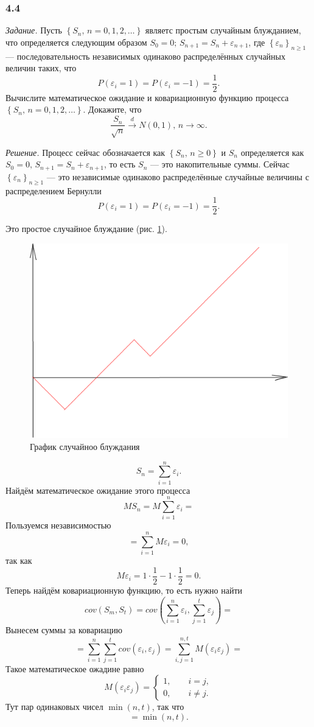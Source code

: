 \subsubsection*{4.4}

\textit{Задание.}
Пусть $ \left\{ S_n, \, n = 0, 1, 2, \dotsc \right\} $ являетс простым случайным блужданием,
что определяется следующим образом $S_0 = 0; \, S_{n + 1} = S_n + \varepsilon_{n + 1}$,
где $ \left\{ \varepsilon_n \right\}_{n \geq 1}$ ---
последовательность независимых одинаково распределённых случайных величин таких, что
$$P \left( \varepsilon_i = 1 \right) =
  P \left( \varepsilon_i = -1 \right) =
  \frac{1}{2}.$$
Вычислите математическое ожидание и ковариационную функцию процесса
$ \left\{ S_n, \, n = 0, 1, 2, \dotsc \right\} $.
Докажите, что
$$ \frac{S_n}{ \sqrt{n}} \overset{d}{ \to } N \left( 0, 1 \right), \,
  n \to \infty.$$

\textit{Решение.}
Процесс сейчас обозначается как $ \left\{ S_n, \, n \geq 0 \right\} $ и $S_n$ определяется как
$S_0 = 0, \, S_{n + 1} = S_n + \varepsilon_{n + 1}$, то есть $S_n$ --- это накопительные суммы.
Сейчас $ \left\{ \varepsilon_n \right\}_{n \geq 1}$ ---
это независимые одинаково распределённые случайные величины с распределением Бернулли
$$P \left( \varepsilon_i = 1 \right) =
  P \left( \varepsilon_i = -1 \right) =
  \frac{1}{2}.$$

Это простое случайное блуждание (рис. \ref{fig:44}).

\begin{figure}[h!]
  \centering
  \includegraphics[width=.4\textwidth]{./pictures/4_4.png}
  \caption{График случайноо блуждания}
  \label{fig:44}
\end{figure}

$$S_n =
  \sum \limits_{i = 1}^n \varepsilon_i.$$
Найдём математическое ожидание этого процесса
$$MS_n =
  M \sum \limits_{i = 1}^n \varepsilon_i =$$
Пользуемся независимостью
$$= \sum \limits_{i = 1}^n M \varepsilon_i =
  0,$$
так как
$$M \varepsilon_i =
  1 \cdot \frac{1}{2} - 1 \cdot \frac{1}{2} =
  0.$$
Теперь найдём ковариационную функцию, то есть нужно найти
$$cov \left( S_m, S_t \right) =
  cov \left( \sum \limits_{i = 1}^n \varepsilon_i, \sum \limits_{j = 1}^t \varepsilon_j \right) =$$
Вынесем суммы за ковариацию
$$= \sum \limits_{i = 1}^n \sum \limits_{j = 1}^t cov \left( \varepsilon_i, \varepsilon_j \right) =
\sum \limits_{i, j = 1}^{n, t} M \left( \varepsilon_i \varepsilon_j \right) =$$
Такое математическое ожадине равно
$$M \left( \varepsilon_i \varepsilon_j \right) =
  \begin{cases}
    1, \qquad i = j, \\
    0, \qquad i \neq j.
  \end{cases}$$
Тут пар одинаковых чисел $ \min \left( n, t \right) $, так что
$$= \min \left( n, t \right).$$

